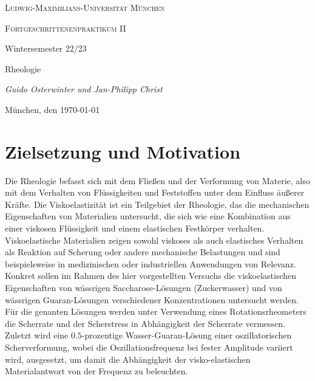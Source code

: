 \documentclass[11pt,a4paper,oneside]{scrartcl}
\begin{document}
\begin{titlepage}
	\centering
	{\scshape\LARGE Ludwig-Maximilians-Universität \linebreak München \par}
	\vspace{1cm}
	{\scshape\Large Fortgeschrittenenpraktikum II \par Wintersemester 22/23 \par}
	\vspace{1.5cm}
	{\huge\bfseries \par  Rheologie\par}
	\vspace{2cm}
	{\Large\itshape Guido Osterwinter und Jan-Philipp Christ \par}
	\vfill
	{\large München, den \today\par}
\end{titlepage}

\tableofcontents
\newpage
\section{Zielsetzung und Motivation}

Die Rheologie befasst sich mit dem Fließen und der Verformung von Materie, also mit dem Verhalten von Flüssigkeiten und Feststoffen unter dem Einfluss äußerer Kräfte. Die Viskoelastizität ist ein Teilgebiet der Rheologie, das die mechanischen Eigenschaften von Materialien untersucht, die sich wie eine Kombination aus einer viskosen Flüssigkeit und einem elastischen Festkörper verhalten. Viskoelastische Materialien zeigen sowohl viskoses als auch elastisches Verhalten als Reaktion auf Scherung oder andere mechanische Belastungen und sind beispielsweise in medizinischen oder industriellen Anwendungen von Relevanz.\\
Konkret sollen im Rahmen des hier vorgestellten Versuchs die viskoelastischen Eigenschaften von wässrigen Saccharose-Lösungen (Zuckerwasser) und von wässrigen Guaran-Lösungen verschiedener Konzentrationen untersucht werden. Für die genanten Lösungen werden unter Verwendung eines Rotationsrheometers die Scherrate und der Scherstress  in Abhängigkeit der Scherrate vermessen.\\
Zuletzt wird eine $0.5$-prozentige Wasser-Guaran-Lösung einer oszillatorischen Scherverformung, wobei die Oszillationsfrequenz bei fester Amplitude variiert wird, ausgesetzt, um damit die Abhängigkeit der visko-elastischen Materialantwort  von der Frequenz zu beleuchten.
\end{document}
